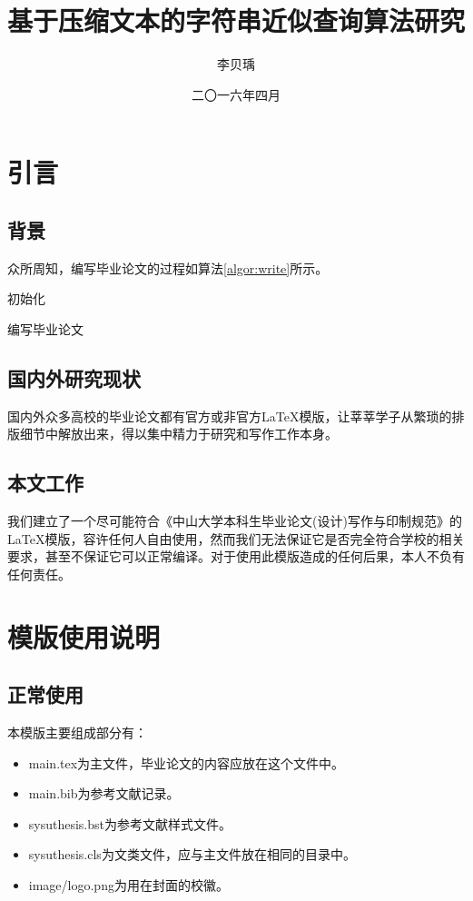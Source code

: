 ﻿\documentclass{sysuthesis}
\title{基于压缩文本的字符串近似查询算法研究}
\author{李贝瑀}
\date{二〇一六年四月}
\begin{document}
\frontmatter

\cleardoublepage
\tableofcontents

\mainmatter



\chapter{引言}

\section{背景}

 众所周知，编写毕业论文的过程如算法\ref{algor:write}所示。

\begin{algorithm}[H]
初始化\;
\caption{编写毕业论文}
\label{algor:write}
\end{algorithm}

\section{国内外研究现状}

国内外众多高校的毕业论文都有官方或非官方\LaTeX 模版，让莘莘学子从繁琐的排版细节中解放出来，得以集中精力于研究和写作工作本身。 

\section{本文工作}

我们建立了一个尽可能符合《中山大学本科生毕业论文(设计)写作与印制规范》的\LaTeX 模版，容许任何人自由使用，然而我们无法保证它是否完全符合学校的相关要求，甚至不保证它可以正常编译。对于使用此模版造成的任何后果，本人不负有任何责任。

\chapter{模版使用说明}

\section{正常使用}

本模版主要组成部分有：

\begin{itemize}
\item {\ttfamily main.tex}为主文件，毕业论文的内容应放在这个文件中。
\item {\ttfamily main.bib}为参考文献记录。
\item {\ttfamily sysuthesis.bst}为参考文献样式文件。
\item {\ttfamily sysuthesis.cls}为文类文件，应与主文件放在相同的目录中。
\item {\ttfamily image/logo.png}为用在封面的校徽。
\end{itemize}
\end{document}
